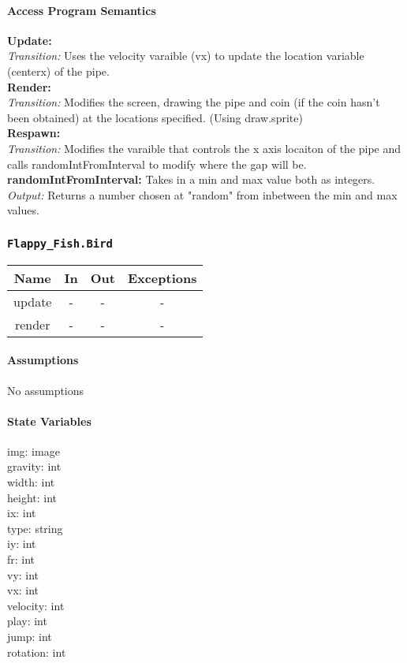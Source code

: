 \documentclass[11pt, oneside]{article}   	%
\begin{document}
\paragraph{Access Program Semantics} 
 \textbf{Update:}  \\
 \textit{Transition:} Uses the velocity varaible (vx) to update the location variable (centerx) of the pipe.\\
 \textbf{Render:}  \\
 \textit{Transition:} Modifies the screen, drawing the pipe and coin (if the coin hasn't been obtained) at the locations specified. (Using draw.sprite)\\
 \textbf{Respawn:}  \\
 \textit{Transition:} Modifies the varaible that controls the x axis locaiton of the pipe and calls randomIntFromInterval to modify where the gap will be.\\
 \textbf{randomIntFromInterval:} Takes in a min and max value both as integers. \\
 \textit{Output:} Returns a number chosen at "random" from inbetween the min and max values.\\

\subsubsection{\texttt{Flappy\_Fish.Bird}}



\begin{center}
\begin{tabular}{ |c|c|c|c| } 
 \hline
 Name & In & Out & Exceptions \\ 
 \hline \hline
 update & - & - & - \\ 
render &  -& - & - \\ 
 \hline
\end{tabular}
\end{center}

\paragraph{Assumptions}
No assumptions

\paragraph{State Variables}
img: image\\
gravity: int\\
width: int\\
height: int \\
ix: int \\
type: string\\
iy: int \\
fr: int \\
vy: int \\
vx: int \\
velocity: int \\
play: int\\
jump: int \\
rotation: int\\
\end{document}

